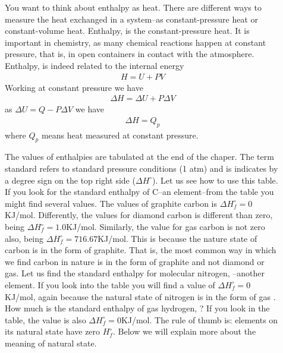 \documentclass[main.tex]{subfiles}
\begin{document}
\sloppy
\begin{description}

  
  \item[] 
You want to think about enthalpy as heat. There are different ways to measure the heat exchanged in a system--as constant-pressure heat or constant-volume heat. Enthalpy, is the constant-pressure heat. It is important in chemistry, as many chemical reactions happen at constant pressure, that is, in open containers in contact with the atmosphere. Enthalpy, is indeed related to the internal energy
\begin{equation*}\begin{split}
H=U+PV 
\end{split}\end{equation*}
Working at constant pressure we have
  \begin{equation*}\begin{split}
\Delta H=\Delta U+P\Delta V 
\end{split}\end{equation*}
as $\Delta U =Q-P\Delta V$ we have
  \begin{equation*}\begin{split}
\Delta H= Q_{p} 
\end{split}\end{equation*}
where $Q_{p} $ means heat measured at constant pressure. 
\item[] 
The values of enthalpies are tabulated at the end of the chaper. The term standard refers to standard pressure conditions (1 atm) and is indicates by a degree sign on the top right side ($\Delta H^{\circ}$). Let us see how to use this table. If you look for the standard enthalpy of C--an element--from the table you might find several values. The values of graphite carbon is $\Delta H_f^{\circ}=0$KJ/mol. Differently, the values for diamond carbon is different than zero, being $\Delta H_f^{\circ}=1.0$KJ/mol. Similarly, the value for gas carbon is not zero also, being $\Delta H_f^{\circ}=716.67$KJ/mol. This is because the nature state of carbon is in the form of graphite. That is, the most common way in which we find carbon in nature is in the form of graphite and not diamond or gas. Let us find the standard enthalpy for molecular nitrogen, --another element. If you look into the table you will find a value of $\Delta H_f^{\circ}=0$KJ/mol, again because the natural state of nitrogen is in the form of gas . How much is the standard enthalpy of gas hydrogen, ? If you look in the table, the value is also $\Delta H_f^{\circ}=0$KJ/mol. The rule of thumb is: elements on its natural state have zero $H_f^{\circ}$. Below we will explain more about the meaning of natural state.

\end{description}
\end{document}

